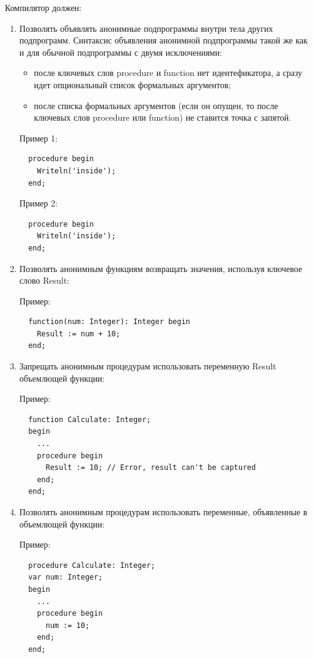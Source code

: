 \documentclass{imcs}
\begin{document}
Компилятор должен:
\begin{enumerate}
    \item Позволять объявлять анонимные подпрограммы внутри тела других подпрограмм.
Синтаксис объявления анонимной подпрограммы такой же как и для обычной подпрограммы с двумя исключениями:
        \begin{itemize}
            \item после ключевых слов procedure и function нет идентефикатора, а сразу идет опциональный список формальных аргументов;
            \item после списка формальных аргументов (если он опущен, то после ключевых слов procedure или function) не ставится точка с запятой.
        \end{itemize}

         Пример 1:
\begin{lstlisting}
  procedure begin
    Writeln('inside');
  end;
\end{lstlisting}

         Пример 2:
\begin{lstlisting}
  procedure begin
    Writeln('inside');
  end;
\end{lstlisting}

    \item Позволять анонимным функциям возвращать значения, используя ключевое слово Result:

Пример:
\begin{lstlisting}
  function(num: Integer): Integer begin
    Result := num + 10;
  end;
\end{lstlisting}

    \item Запрещать анонимным процедурам использовать переменную Result объемлющей функции:

Пример:
\begin{lstlisting}
  function Calculate: Integer;
  begin
    ...
    procedure begin
      Result := 10; // Error, result can't be captured
    end;
  end;
\end{lstlisting}

    \item Позволять анонимным процедурам использовать переменные, объявленные в объемлющей функции:

Пример:
\begin{lstlisting}
  procedure Calculate: Integer;
  var num: Integer;
  begin
    ...
    procedure begin
      num := 10;
    end;
  end;
\end{lstlisting}


\end{enumerate}
\end{document}
